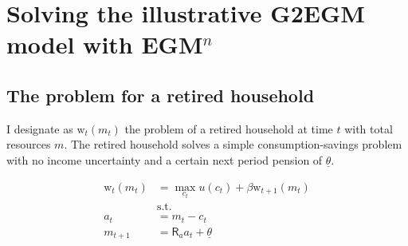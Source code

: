 \documentclass{article}
\newcommand{\DiscFac}{\beta}
\newcommand{\util}{u}
\newcommand{\tShkEmp}{\theta}
\newcommand{\cRat}{c}
\newcommand{\Rfree}{\mathsf{R}}
\newcommand{\aRat}{a}
\newcommand{\mRat}{m}
\newcommand{\wFunc}{\mathrm{w}}
\begin{document}





\section{Solving the illustrative G2EGM model with EGM$^n$}\label{appendix}

\subsection{The problem for a retired household}\label{The problem for a retired household}

I designate as $\wFunc_{t}(\mRat_{t})$ the problem of a retired household at time $t$ with total resources $\mRat$. The retired household solves a simple consumption-savings problem with no income uncertainty and a certain next period pension of $\underline{\tShkEmp}$.

\begin{equation}
\begin{split}
        \wFunc_{t}(\mRat_{t}) & = \max_{\cRat_{t}} \util(\cRat_{t}) +
        \DiscFac \wFunc_{t+1}(\mRat_{t}) \\
        & \text{s.t.} \\
        \aRat_{t} & = \mRat_{t} - \cRat_{t} \\
        \mRat_{t+1} & = \Rfree_{\aRat} \aRat_{t} +
        \underline{\tShkEmp}
    \end{split}
\end{equation}
\end{document}
